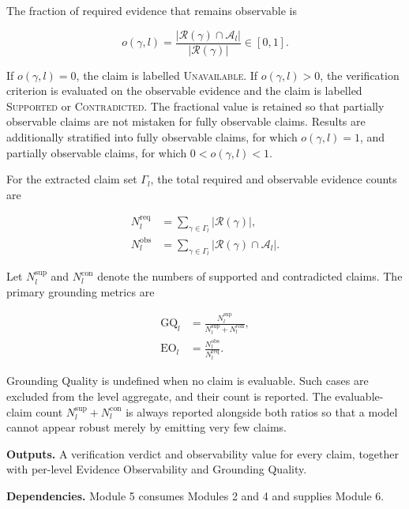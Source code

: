 \documentclass{ssnreview}
\begin{document}
The fraction of required evidence that remains observable is

\begin{equation}
  o(\gamma,l)
  =\frac{|\mathcal{R}(\gamma)\cap\mathcal{A}_l|}
  {|\mathcal{R}(\gamma)|}\in[0,1].
  \label{eq:claim-observability}
\end{equation}

If $o(\gamma,l)=0$, the claim is labelled \textsc{Unavailable}. If
$o(\gamma,l)>0$, the verification criterion is evaluated on the observable evidence and
the claim is labelled \textsc{Supported} or \textsc{Contradicted}. The fractional value
is retained so that partially observable claims are not mistaken for fully observable
claims. Results are additionally stratified into fully observable claims, for which
$o(\gamma,l)=1$, and partially observable claims, for which
$0<o(\gamma,l)<1$.

For the extracted claim set $\Gamma_l$, the total required and observable evidence counts
are

\begin{align}
  N^{\mathrm{req}}_l
  &=\sum_{\gamma\in\Gamma_l}|\mathcal{R}(\gamma)|,
  \label{eq:required-evidence}\\
  N^{\mathrm{obs}}_l
  &=\sum_{\gamma\in\Gamma_l}
  |\mathcal{R}(\gamma)\cap\mathcal{A}_l|.
  \label{eq:observable-evidence}
\end{align}

Let $N^{\mathrm{sup}}_l$ and $N^{\mathrm{con}}_l$ denote the numbers of supported
and contradicted claims. The primary grounding metrics are

\begin{align}
  \mathrm{GQ}_l
  &=\frac{N^{\mathrm{sup}}_l}
  {N^{\mathrm{sup}}_l+N^{\mathrm{con}}_l},
  \label{eq:gq}\\
  \mathrm{EO}_l
  &=\frac{N^{\mathrm{obs}}_l}{N^{\mathrm{req}}_l}.
  \label{eq:eo}
\end{align}

Grounding Quality is undefined when no claim is evaluable. Such cases are excluded from
the level aggregate, and their count is reported. The evaluable-claim count
$N^{\mathrm{sup}}_l+N^{\mathrm{con}}_l$ is always reported alongside both ratios so
that a model cannot appear robust merely by emitting very few claims.

\textbf{Outputs.} A verification verdict and observability value for every claim,
together with per-level Evidence Observability and Grounding Quality.

\textbf{Dependencies.} Module 5 consumes Modules 2 and 4 and supplies Module 6.
\end{document}

